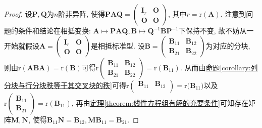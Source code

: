 \documentclass[../../main.tex]{subfiles}%
\begin{document}
\begin{proof}

设\(\boldsymbol{P},\boldsymbol{Q}\)为\(n\)阶非异阵, 使得\(\boldsymbol{PAQ}=\begin{pmatrix}\boldsymbol{I}_{r}&\boldsymbol{O}\\\boldsymbol{O}&\boldsymbol{O}\end{pmatrix}\), 其中\(r = \mathrm{r}(\boldsymbol{A})\). 注意到问题的条件和结论在相抵变换: \(\boldsymbol{A}\mapsto\boldsymbol{PAQ},\boldsymbol{B}\mapsto\boldsymbol{Q}^{-1}\boldsymbol{BP}^{-1}\)下保持不变, 故不妨从一开始就假设\(\boldsymbol{A}=\begin{pmatrix}\boldsymbol{I}_{r}&\boldsymbol{O}\\\boldsymbol{O}&\boldsymbol{O}\end{pmatrix}\)是相抵标准型. 设\(\boldsymbol{B}=\begin{pmatrix}\boldsymbol{B}_{11}&\boldsymbol{B}_{12}\\\boldsymbol{B}_{21}&\boldsymbol{B}_{22}\end{pmatrix}\)为对应的分块, 则由\(\mathrm{r}(\boldsymbol{ABA})=\mathrm{r}(\boldsymbol{B})\)可得\(\mathrm{r}\begin{pmatrix}\boldsymbol{B}_{11}&\boldsymbol{B}_{12}\\\boldsymbol{B}_{21}&\boldsymbol{B}_{22}\end{pmatrix}=\mathrm{r}(\boldsymbol{B}_{11})\). 从而由\hyperref[corollary:列分块与行分块秩等于其交叉块的秩]{命题\ref{corollary:列分块与行分块秩等于其交叉块的秩}}可得\(\mathrm{r}\left( \begin{matrix}
\boldsymbol{B}_{11}&		\boldsymbol{B}_{12}\\
\end{matrix} \right) =\mathrm{r(}\boldsymbol{B}_{11})\)以及\(\mathrm{r}\begin{pmatrix}\boldsymbol{B}_{11}\\\boldsymbol{B}_{21}\end{pmatrix}=\mathrm{r}(\boldsymbol{B}_{11})\), 再由\hyperref[theorem:线性方程组有解的充要条件]{定理\ref{theorem:线性方程组有解的充要条件}}可知存在矩阵\(\boldsymbol{M},\boldsymbol{N}\), 使得\(\boldsymbol{B}_{11}\boldsymbol{N}=\boldsymbol{B}_{12},\boldsymbol{M}\boldsymbol{B}_{11}=\boldsymbol{B}_{21}\). 


\end{proof}
\end{document}
